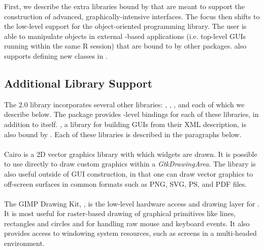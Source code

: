 \documentclass[article]{jss}
\begin{document}
First, we describe the extra libraries bound by  that are
meant to support the construction of advanced, graphically-intensive
interfaces. The focus then shifts to the low-level support for the
 object-oriented programming library. The 
user is able to manipulate objects in external -based
applications (i.e. top-level GUIs running within the same R session)
that are bound to  by other packages.  also
supports defining new  classes in .

\subsection{Additional Library Support}

The  2.0 library incorporates several other libraries:
, , ,  and 
each of which we describe below.  The  package provides
-level bindings for each of these libraries, in addition
to  itself.  , a library for building GUIs
from their XML description, is also bound by . Each of
these libraries is described in the paragraphs below.

\paragraph[Cairo]{} 

Cairo is a 2D vector graphics library with which  widgets
are drawn. It is possible to use  directly to draw custom
graphics within a \emph{GtkDrawingArea}. The library is also useful
outside of GUI construction, in that one can draw vector graphics to
off-screen surfaces in common formats such as PNG, SVG, PS, and PDF
files.

\paragraph[GDK]{}

The GIMP Drawing Kit, , is the low-level hardware access and
drawing layer 
for . It is most useful for raster-based drawing of
graphical 
primitives like lines, rectangles and circles and for handling raw
mouse and 
keyboard events. It also provides access to windowing system
resources, such
as screens in a multi-headed environment.

\paragraph[GdkPixbuf]{}
\end{document}
